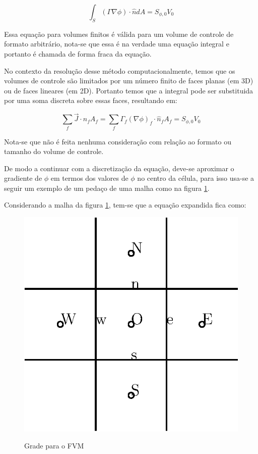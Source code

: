 \begin{equation}
    \int_S (\Gamma \nabla \phi) \cdot \hat{n} dA = S_{\phi,0} V_0
\end{equation}

Essa equação para volumes finitos é válida para um volume de controle de formato arbitrário, nota-se que essa é na verdade uma equação integral e portanto é chamada de forma fraca da equação.

No contexto da resolução desse método computacionalmente, temos que os volumes de controle são limitados por um número finito de faces planas (em 3D) ou de faces lineares (em 2D). Portanto temos que a integral pode ser substituida por uma soma discreta sobre essas faces, resultando em:

\begin{equation}
    \sum_f \vec{J} \cdot \hat{n}_f A_f = \sum_f \Gamma_f (\nabla \phi)_f \cdot \hat{n}_f A_f = S_{\phi,0} V_0
\end{equation}

Nota-se que não é feita nenhuma consideração com relação ao formato ou tamanho do volume de controle.

De modo a continuar com a discretização da equação, deve-se aproximar o gradiente de $\phi$ em termos dos valores de $\phi$ no centro da célula, para isso usa-se a seguir um exemplo de um pedaço de uma malha como na figura \ref{fig:fig1}.

Considerando a malha da figura \ref{fig:fig1}, tem-se que a equação expandida fica como:

\begin{figure}
    \centering
    \caption{Grade para o FVM}
    \includegraphics{fig/figura1}
    \label{fig:fig1}    
\end{figure}

